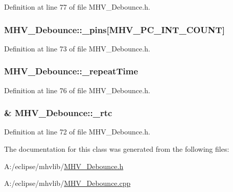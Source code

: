 \-Definition at line 77 of file \-M\-H\-V\-\_\-\-Debounce.\-h.

\hypertarget{class_m_h_v___debounce_a5cf65bfecfc0efd4d51e1506972d2796}{
\subsubsection[{\-\_\-pins}]{ {\bf \-M\-H\-V\-\_\-\-Debounce\-::\-\_\-pins}\mbox{[}\-M\-H\-V\-\_\-\-P\-C\-\_\-\-I\-N\-T\-\_\-\-C\-O\-U\-N\-T\mbox{]}}}
\label{class_m_h_v___debounce_a5cf65bfecfc0efd4d51e1506972d2796}


\-Definition at line 73 of file \-M\-H\-V\-\_\-\-Debounce.\-h.

\hypertarget{class_m_h_v___debounce_a422167777e3bfcf6b7b46b992058950f}{
\subsubsection[{\-\_\-repeat\-Time}]{ {\bf \-M\-H\-V\-\_\-\-Debounce\-::\-\_\-repeat\-Time}}}
\label{class_m_h_v___debounce_a422167777e3bfcf6b7b46b992058950f}


\-Definition at line 76 of file \-M\-H\-V\-\_\-\-Debounce.\-h.

\hypertarget{class_m_h_v___debounce_a5594f588099ccfcff2b3b23b503e8f6d}{
\subsubsection[{\-\_\-rtc}]{\& {\bf \-M\-H\-V\-\_\-\-Debounce\-::\-\_\-rtc}}}
\label{class_m_h_v___debounce_a5594f588099ccfcff2b3b23b503e8f6d}


\-Definition at line 72 of file \-M\-H\-V\-\_\-\-Debounce.\-h.



\-The documentation for this class was generated from the following files\-:\begin{DoxyCompactItemize}
\item 
\-A\-:/eclipse/mhvlib/\hyperlink{_m_h_v___debounce_8h}{\-M\-H\-V\-\_\-\-Debounce.\-h}\item 
\-A\-:/eclipse/mhvlib/\hyperlink{_m_h_v___debounce_8cpp}{\-M\-H\-V\-\_\-\-Debounce.\-cpp}\end{DoxyCompactItemize}
